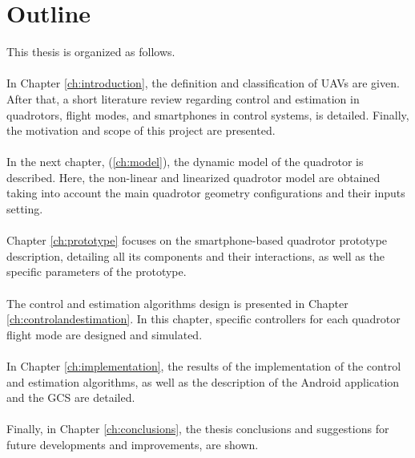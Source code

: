 \section{Outline}
This thesis is organized as follows.\\\\
In Chapter \ref{ch:introduction}, the definition and classification of UAVs are given. After that, a short literature review regarding control and estimation in quadrotors, flight modes, and smartphones in control systems, is detailed. Finally, the motivation and scope of this project are presented.
\\\\
In the next chapter, (\ref{ch:model}), the dynamic model of the quadrotor is described. Here, the non-linear and linearized quadrotor model are obtained taking into account the main quadrotor geometry configurations and their inputs setting. 
\\\\
Chapter \ref{ch:prototype} focuses on the smartphone-based quadrotor prototype description, detailing all its components and their interactions, as well as the specific parameters of the prototype.
\\\\
The control and estimation algorithms design is presented in Chapter \ref{ch:controlandestimation}. In this chapter, specific controllers for each quadrotor flight mode are designed and simulated.
\\\\
In Chapter \ref{ch:implementation}, the results of the implementation of the control and estimation algorithms, as well as the description of the Android application and the GCS are detailed.
\\\\
Finally, in Chapter \ref{ch:conclusions}, the thesis conclusions and suggestions for future developments and improvements, are shown.